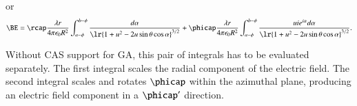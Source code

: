 or
\begin{dmath}\label{eqn:circularlinecharge:220}
\BE
= \rcap \frac{\lambda r}{4 \pi \epsilon_0 R^2} \int_{a-\phi}^{b-\phi} \frac{ d\alpha }{\lr{ 1 + u^2 - 2 u \sin\theta \cos \alpha }^{3/2} }
+ \phicap
\frac{\lambda r}{4 \pi \epsilon_0 R^2} \int_{a-\phi}^{b-\phi} \frac{ u i e^{i \alpha } d\alpha }{\lr{ 1 + u^2 - 2 u \sin\theta \cos \alpha }^{3/2} }.
\end{dmath}

Without CAS support for GA, this pair of integrals has to be evaluated separately.  The first integral
scales the radial component of the electric field.  The second integral scales and rotates \( \phicap \) within the azimuthal plane, producing an electric field component in a \( \phicap' \) direction.

